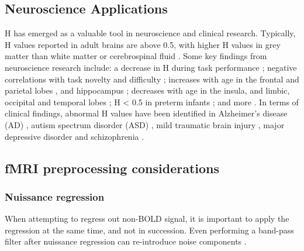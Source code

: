 \documentclass[
  sn-vancouver,
  Numbered,
  referee,
  lineno]{sn-jnl}
\begin{document}
\subsection{Neuroscience Applications}\label{neuroscience-applications}

H has emerged as a valuable tool in neuroscience and clinical research.
Typically, H values reported in adult brains are above 0.5, with higher
H values in grey matter than white matter or cerebrospinal fluid
\citep{dongHurstExponentAnalysis2018, winkMonofractalMultifractalDynamics2008}.
Some key findings from neuroscience research include: a decrease in H
during task performance
\citep{ciuciuInterplayFunctionalConnectivity2014, heScaleFreePropertiesFunctional2011};
negative correlations with task novelty and difficulty
\citep{churchillSuppressionScalefreeFMRI2016}; increases with age in the
frontal and parietal lobes \citep{dongHurstExponentAnalysis2018}, and
hippocampus \citep{winkAgeCholinergicEffects2006}; decreases with age in
the insula, and limbic, occipital and temporal lobes
\citep{dongHurstExponentAnalysis2018}; H \textless{} 0.5 in preterm
infants \citep{mellaTemporalComplexityBOLDsignal2024}; and more
\citep{campbellMonofractalAnalysisFunctional2022}. In terms of clinical
findings, abnormal H values have been identified in Alzheimer's disease
(AD)
\citep{maximFractionalGaussianNoise2005, warsiCorrelatingBrainBlood2012},
autism spectrum disorder (ASD)
\citep{donaTemporalFractalAnalysis2017, laiShiftRandomnessBrain2010, linkeAlteredDevelopmentHurst2024, uscatescuUsingExcitationInhibition2022},
mild traumatic brain injury \citep{donaFractalAnalysisBrain2017}, major
depressive disorder
\citep{weiIdentifyingMajorDepressive2013, jingIdentifyingCurrentRemitted2017}
and schizophrenia
\citep{sokunbiNonlinearComplexityAnalysis2014, uscatescuUsingExcitationInhibition2022}.

\subsection{fMRI preprocessing
considerations}\label{fmri-preprocessing-considerations}

\subsubsection{Nuissance regression}\label{nuissance-regression}

When attempting to regress out non-BOLD signal, it is important to apply
the regression at the same time, and not in succession. Even performing
a band-pass filter after nuissance regression can re-introduce noise
components \citep{lindquistModularPreprocessingPipelines2019}.
\end{document}
